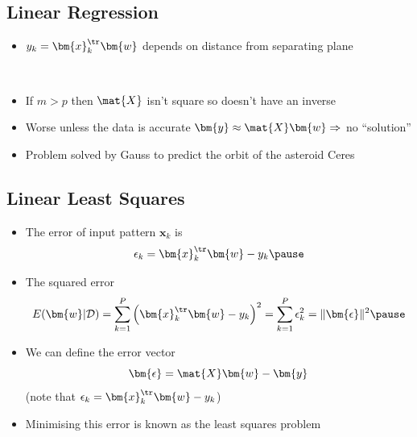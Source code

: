 \begin{slide}
\section[-2]{Linear Regression}

\pb
\begin{itemize}\squeeze
\item $y_k = \bm{x}_k^\tr \bm{w}$ depends on distance from separating
  plane\pauseh{}
\vspace*{-1cm}
\begin{center}
\pause\\
\vspace*{-0.5cm}
\end{center}
\item If $m>p$ then $\mat{X}$ isn't square so doesn't have an inverse\pauseh
\item Worse unless the data is accurate $\bm{y} \approx \mat{X}
  \bm{w}\Rightarrow$ no ``solution''\pauseh
\item Problem solved by Gauss to predict the orbit of the asteroid Ceres\pauseh
\end{itemize}
\end{slide}


\begin{slide}
\section[-1.5]{Linear Least Squares}

\begin{PauseHighLight}

\begin{itemize}\squeeze
\item The error of input pattern $\bm{x}_k$ is
  \begin{displaymath}
    \epsilon_k  = \bm{x}_k^\tr \bm{w}-y_k\pause
  \end{displaymath}
\item The squared error
  \begin{displaymath}
    E(\bm{w}|\mathcal{D}) = 
    \sum_{k=1}^P\left(\bm{x}_k^\tr \bm{w}-y_k\right)^2
    = \sum_{k=1}^P \epsilon_k^2 = \| \bm{\epsilon} \|^2 \pause
  \end{displaymath}
\item We can define the error vector
  \begin{displaymath}
    \bm{\epsilon} = \mat{X} \bm{w} - \bm{y}
  \end{displaymath}
(note that $\epsilon_k = \bm{x}_k^\tr \bm{w} -y_k$)\pause
\item Minimising this error is known as the least squares problem\pause
\end{itemize}

\end{PauseHighLight}
\end{slide}

